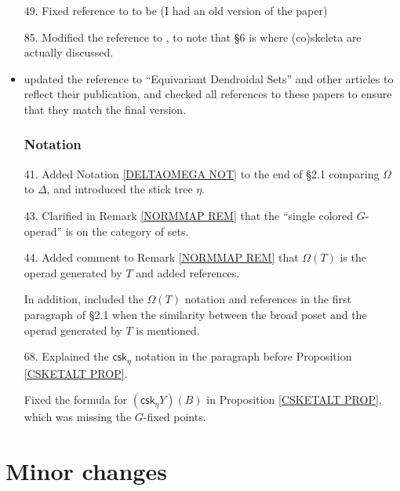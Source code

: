 \documentclass{article}
\begin{document}
\begin{itemize}
\item[49.] Fixed reference to \cite[Thm. 3.3.8]{Hir03} to be \cite[Thm. 3.2.13]{Hir03} (I had an old version of the paper)
      
\item[85.] Modified the reference \cite[\S 4]{BM11} to \cite[\S 4,\S 6]{BM11}, to note that \S 6 is where (co)skeleta are actually discussed.
      
\item updated the reference to ``Equivariant Dendroidal Sets'' and other articles to reflect their publication,
      and checked all references to these papers to ensure that they match the final version. %




      \subsubsection*{Notation}
\item[41.] Added Notation \ref{DELTAOMEGA NOT} to the end of \S 2.1 comparing $\Omega$ to $\Delta$, and introduced the stick tree $\eta$. %

      
\item[43.] Clarified in Remark \ref{NORMMAP REM} that the ``single colored $G$-operad'' is on the category of sets. %

      
\item[44.] Added comment to Remark \ref{NORMMAP REM} that $\Omega(T)$ is the operad generated by $T$ and added references. %

      In addition, included the $\Omega(T)$ notation and references in the first paragraph of \S 2.1 when the similarity between the broad poset and the operad generated by $T$ is mentioned. %

      
\item[68.] Explained the $\mathsf{csk}_{\eta}$ notation in the paragraph before Proposition \ref{CSKETALT PROP}. %

      Fixed the formula for $(\mathsf{csk}_{\eta} Y)(B)$ in Proposition \ref{CSKETALT PROP}, which was missing the $G$-fixed points.

                           
\end{itemize}








\section{Minor changes}
 
\end{document}
